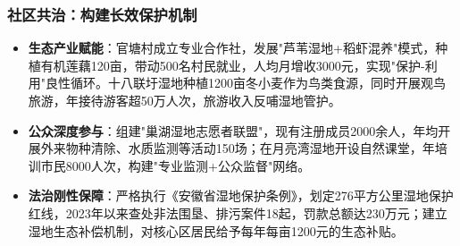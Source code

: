 \subsubsection{社区共治：构建长效保护机制}
\begin{itemize}
    \item \textbf{生态产业赋能}：官塘村成立专业合作社，发展"芦苇湿地+稻虾混养"模式，种植有机莲藕120亩，带动500名村民就业，人均月增收3000元，实现"保护-利用"良性循环。十八联圩湿地种植1200亩冬小麦作为鸟类食源，同时开展观鸟旅游，年接待游客超50万人次，旅游收入反哺湿地管护。

    \item \textbf{公众深度参与}：组建"巢湖湿地志愿者联盟"，现有注册成员2000余人，年均开展外来物种清除、水质监测等活动150场；在月亮湾湿地开设自然课堂，年培训市民8000人次，构建"专业监测+公众监督"网络。

    \item \textbf{法治刚性保障}：严格执行《安徽省湿地保护条例》，划定276平方公里湿地保护红线，2023年以来查处非法围垦、排污案件18起，罚款总额达230万元；建立湿地生态补偿机制，对核心区居民给予每年每亩1200元的生态补贴。
\end{itemize}
